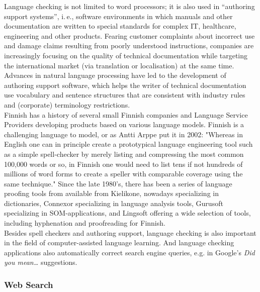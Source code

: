 \begin{multicols}{2}

Language checking is not limited to word processors; it is also used
in “authoring support systems”, i.\,e., software environments in which
manuals and other documentation are written to special standards for
complex IT, healthcare, engineering and other products. Fearing
customer complaints about incorrect use and damage claims resulting
from poorly understood instructions, companies are increasingly
focusing on the quality of technical documentation while targeting the
international market (via translation or localisation) at the same
time. Advances in natural language processing have led to the
development of authoring support software, which helps the writer of
technical documentation use vocabulary and sentence structures that
are consistent with industry rules and (corporate) terminology
restrictions.\\
Finnish has a history of several small Finnish companies and Language
Service Providers developing products based on various language
models. Finnish is a challenging language to model, or as Antti Arppe
put it in 2002: "Whereas in English one can in principle create a
prototypical language engineering tool such as a simple spell-checker
by merely listing and compressing the most common 100,000 words or so,
in Finnish one would need to list tens if not hundreds of millions of
word forms to create a speller with comparable coverage using the same
technique." \cite{NoPath} Since the late 1980's, there has been a
series of language proofing tools from available from Kielikone,
nowadays specializing in dictionaries, Connexor specializing in
language analysis tools, Gurusoft specializing in SOM-applications,
and Lingsoft offering a wide selection of tools,
including hyphenation and proofreading for Finnish.\\
Besides spell checkers and authoring support, language checking is
also important in the field of computer-assisted language
learning. And language checking applications also automatically
correct search engine queries, e.g. in Google's \textit{Did you
mean\dots} suggestions.

\subsubsection{Web Search}


\end{multicols}
